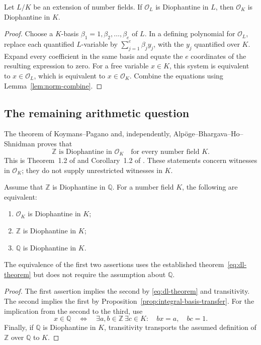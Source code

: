 \begin{proposition}\label{prop:descent-integrality}
Let $L/K$ be an extension of number fields.  If $\mathcal O_L$ is
Diophantine in $L$, then $\mathcal O_K$ is Diophantine in $K$.
\end{proposition}
\begin{proof}
Choose a $K$-basis $\beta_1=1,\beta_2,\ldots,\beta_e$ of $L$.
In a defining polynomial for $\mathcal O_L$, replace each quantified
$L$-variable by $\sum_{j=1}^e\beta_j y_j$, with the $y_j$ quantified
over $K$.  Expand every coefficient in the same basis and equate the
$e$ coordinates of the resulting expression to zero.  For a free
variable $x\in K$, this system is equivalent to $x\in\mathcal O_L$,
which is equivalent to $x\in\mathcal O_K$.  Combine the equations
using Lemma~\ref{lem:norm-combine}.
\end{proof}

\subsection{The remaining arithmetic question}

The theorem of Koymans--Pagano and, independently,
Alp\"oge--Bhargava--Ho--Shnidman proves that
\begin{equation}\label{eq:dl-theorem}
 \mathbb Z\text{ is Diophantine in }\mathcal O_K
 \quad\text{for every number field }K.
\end{equation}
This is Theorem~1.2 of \cite{KoymansPagano2026} and Corollary~1.2 of
\cite{AlpogeBhargavaHoShnidman2026}.  These statements concern witnesses
in $\mathcal O_K$; they do not supply unrestricted witnesses in $K$.

\begin{theorem}
\label{thm:nf-equivalence}
Assume that $\mathbb Z$ is Diophantine in $\mathbb Q$.
For a number field $K$, the following are equivalent:
\begin{enumerate}
 \item $\mathcal O_K$ is Diophantine in $K$;
 \item $\mathbb Z$ is Diophantine in $K$;
 \item $\mathbb Q$ is Diophantine in $K$.
\end{enumerate}
The equivalence of the first two assertions uses the established
theorem~\eqref{eq:dl-theorem} but does not require the assumption about
$\mathbb Q$.
\end{theorem}
\begin{proof}
The first assertion implies the second by
\eqref{eq:dl-theorem} and transitivity.  The second implies the first
by Proposition~\ref{prop:integral-basis-transfer}.
For the implication from the second to the third, use
\[
 x\in\mathbb Q\quad\Longleftrightarrow\quad
 \exists a,b\in\mathbb Z\ \exists c\in K:
 \quad bx=a,\quad bc=1.
\]
Finally, if $\mathbb Q$ is Diophantine in $K$, transitivity transports
the assumed definition of $\mathbb Z$ over $\mathbb Q$ to $K$.
\end{proof}

